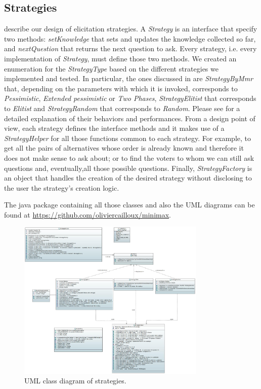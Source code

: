 \subsection{Strategies}

 describe our design of elicitation strategies. A \textit{Strategy} is an interface that specify two methods: \textit{setKnowledge} that sets and updates the knowledge collected so far, and \textit{nextQuestion} that returns the next question to ask. Every strategy, i.e. every implementation of \textit{Strategy}, must define those two methods. We created an enumeration for the \textit{StrategyType} based on the different strategies we implemented and tested.
In particular, the ones discussed in  are \textit{StrategyByMmr} that, depending on the parameters with which it is invoked, corresponds to \textit{Pessimistic}, \textit{Extended pessimistic} or \textit{Two Phases}, \textit{StrategyElitist} that corresponds to \textit{Elitist} and \textit{StrategyRandom} that corresponds to \textit{Random}.
Please see  for a detailed explanation of their behaviors and performances.
From a design point of view, each strategy defines the interface methods and it makes use of a \textit{StrategyHelper} for all those functions common to each strategy. For example, to get all the pairs of alternatives whose order is already known and therefore it does not make sense to ask about; or to find the voters to whom we can still ask questions and, eventually,all those possible questions.
Finally, \textit{StrategyFactory} is an object that handles the creation of the desired strategy without disclosing to the user the strategy's creation logic.

The java package containing all those classes and also the UML diagrams can be found at \url{https://github.com/oliviercailloux/minimax}.

\begin{figure}
	\centering
	\includegraphics[width=0.8\textwidth]{uml/strategies.jpeg}
	\caption{UML class diagram of strategies.}
	\label{uml:strategies}
\end{figure}
